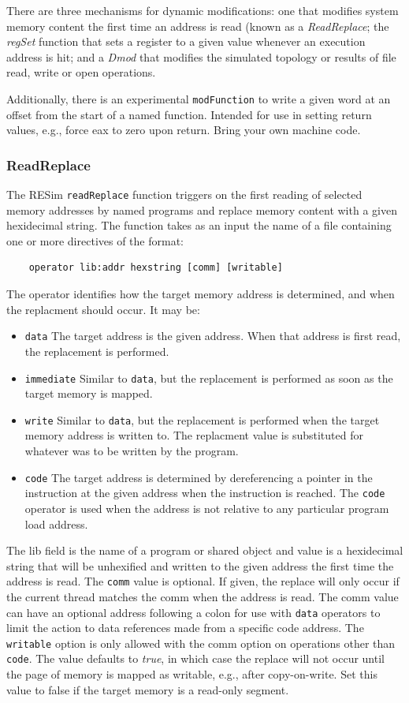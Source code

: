 \documentclass[titlepage]{article}
\begin{document}
There are three mechanisms for dynamic modifications: one that modifies system memory content the first time an address is
read (known as a \textit{ReadReplace}; the \textit{regSet} function that sets a register to a given value whenever an execution 
address is hit; and a \textit{Dmod} that modifies the simulated topology or results of file read, write or open operations.

Additionally, there is an experimental {\tt modFunction} to write a given word at an offset from the start of a named function.  
Intended for use in setting return values, e.g., force eax to zero upon return.  Bring your own machine code.  

\subsubsection{ReadReplace}
\label{read-replace}
The RESim {\tt readReplace} function triggers on the first reading of selected memory addresses
by named programs and replace memory content with a given hexidecimal string.  The function takes as an
input the name of a file containing one or more directives of the format:
\begin{verbatim}
    operator lib:addr hexstring [comm] [writable]
\end{verbatim}

The operator identifies how the target memory address is determined, and when the replacment should occur.  It may be:  
\begin{itemize}
\item {\tt data} The target address is the given address.  When that address is first read, the replacement is performed.
\item {\tt immediate} Similar to {\tt data}, but the replacement is performed as soon as the target memory is mapped.
\item {\tt write} Similar to {\tt data}, but the replacement is performed when the target memory address is written to.  The replacment
value is substituted for whatever was to be written by the program.
\item {\tt code} The target address is determined by dereferencing a pointer in the instruction
at the given address when the instruction is reached.  The {\tt code} operator is used when the address is not relative
to any particular program load address. 
\end{itemize}

The lib field is the name of a program or shared object and value
is a hexidecimal string that will be unhexified and written to the given
address the first time the address is read.  
The {\tt comm} value is optional.  If given, the replace will only occur if the
current thread matches the comm when the address is read.  The comm value can have
an optional address following a colon for use with {\tt data} operators to limit the
action to data references made from a specific code address. 
The {\tt writable} option is only allowed with the comm option on operations other than {\tt code}. The value defaults to \textit{true},
in which case the replace will not occur until the page of memory is mapped as writable, e.g., after copy-on-write.  Set this value to 
false if the target memory is a read-only segment.
\end{document}
